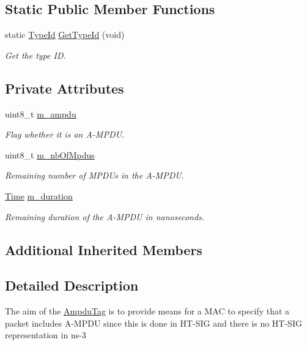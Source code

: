\subsection*{Static Public Member Functions}
\begin{DoxyCompactItemize}
\item 
static \hyperlink{classns3_1_1TypeId}{Type\+Id} \hyperlink{classns3_1_1AmpduTag_a09409ba863bd708b177d2c93cd5eb592}{Get\+Type\+Id} (void)
\begin{DoxyCompactList}\small\item\em Get the type ID. \end{DoxyCompactList}\end{DoxyCompactItemize}
\subsection*{Private Attributes}
\begin{DoxyCompactItemize}
\item 
uint8\+\_\+t \hyperlink{classns3_1_1AmpduTag_a3f5774ca7b2ca57afb7cdeaa22dcb8b6}{m\+\_\+ampdu}
\begin{DoxyCompactList}\small\item\em Flag whether it is an A-\/\+M\+P\+DU. \end{DoxyCompactList}\item 
uint8\+\_\+t \hyperlink{classns3_1_1AmpduTag_af7d038a557bd07ea38664700b14ccffb}{m\+\_\+nb\+Of\+Mpdus}
\begin{DoxyCompactList}\small\item\em Remaining number of M\+P\+D\+Us in the A-\/\+M\+P\+DU. \end{DoxyCompactList}\item 
\hyperlink{classns3_1_1Time}{Time} \hyperlink{classns3_1_1AmpduTag_a35ee6675183604c7b5dda5579ced3b13}{m\+\_\+duration}
\begin{DoxyCompactList}\small\item\em Remaining duration of the A-\/\+M\+P\+DU in nanoseconds. \end{DoxyCompactList}\end{DoxyCompactItemize}
\subsection*{Additional Inherited Members}


\subsection{Detailed Description}
The aim of the \hyperlink{classns3_1_1AmpduTag}{Ampdu\+Tag} is to provide means for a M\+AC to specify that a packet includes A-\/\+M\+P\+DU since this is done in H\+T-\/\+S\+IG and there is no H\+T-\/\+S\+IG representation in ns-\/3 

